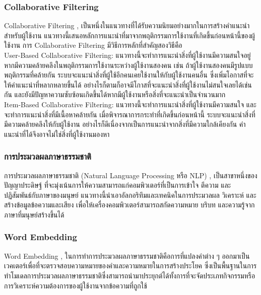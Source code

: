 \documentclass[14pt,oneside,openright,a4paper]{cpe-thai-project}
\begin{document}
\subsubsection {Collaborative Filtering}
  Collaborative Filtering \cite{Item-Based}, \cite{Content-Boosted} เป็นหนึ่งในแนวทางที่ได้รับความนิยมอย่างมากในการสร้างคำแนะนำสำหรับผู้ใช้งาน แนวทางนี้เสนอหลักการแนะนำที่มาจากพฤติกรรมการใช้งานที่เกิดขึ้นก่อนหน้านี้ของผู้ใช้งาน 
  การ Collaborative Filtering มีวิธีการหลักที่สำคัญสองวิธีคือ \\
  User-Based Collaborative Filtering: แนวทางนี้จะทำการแนะนำสิ่งที่ผู้ใช้งานมีความสนใจอยู่ หากมีความคล้ายคลึงในพฤติกรรมการใช้งานระหว่างผู้ใช้งานสองคน 
  เช่น ถ้าผู้ใช้งานสองคนมีรูปแบบพฤติกรรมที่คล้ายกัน ระบบจะแนะนำสิ่งที่ผู้ใช้อีกคนเคยใช้งานให้กับผู้ใช้งานคนอื่น ซึ่งเพิ่มโอกาสที่จะให้คำแนะนำที่หลากหลายขึ้นได้ 
  อย่างไรก็ตามก็อาจมีโกาสที่จะแนะนำสิ่งที่ผู้ใช้งานไม่สนใจเลยได้เช่นกัน และยังมีปัญหาความซับซ้อนเกิดขึ้นได้หากมีผู้ใช้งานหรือสิ่งที่จะแนะนำเป็นจำนวนมาก \\
  Item-Based Collaborative Filtering: แนวทางนี้จะทำการแนะนำสิ่งที่ผู้ใช้งานมีความสนใจ และจะทำการแนะนำสิ่งที่มีเนื้อหาคล้ายกัน เมื่อพิจารณาการกระทำที่เกิดขึ้นก่อนหน้านี้ 
  ระบบจะแนะนำสิ่งที่มีความคล้ายคลึงให้กับผู้ใช้งาน อย่างไรก็ดีเนื่องจากเป็นการแนะนำจากสิ่งที่มีความใกล้เคียงกัน คำแนะนำที่ได้จึงอาจไม่ใช่สิ่งที่ผู้ใช้งานมองหา \\
\subsubsection {การประมวลผลภาษาธรรมชาติ}
การประมวลผลภาษาธรรมชาติ (Natural Language Processing หรือ NLP) \cite{recommendation}, \cite{NLPforContentbase} เป็นสาขาหนึ่งของปัญญาประดิษฐ์ ที่จะมุ่งเน้นการให้ความสามารถแก่คอมพิวเตอร์ที่เป็นการเข้าใจ ตีความ และปฏิสัมพันธ์กับภาษาของมนุษย์ 
แนวทางนี้นำเอาอัลกอริทึมและเทคนิคในการประมวลผล วิเคราะห์ และสร้างข้อมูลข้อความและเสียง เพื่อให้เครื่องคอมพิวเตอร์สามารถสกัดความหมาย บริบท และความรู้จากภาษาที่มนุษย์สร้างขึ้นได้ \\
  \subsubsection {Word Embedding}
	 Word Embedding \cite{WordEmbedding}, \cite{WordEmbeddingForCollaborative} ในการทำการประมวลผลภาษาธรรมชาติคือการที่แปลงคำต่าง ๆ ออกมาเป็นเวคเตอร์เพื่อที่จะตรวจสอบความหมายของคำและความหมายในการสร้างประโยค 
   ซึ่งเป็นพื้นฐานในการทำโมเดลการประมวลผลภาษาธรรมชาติซึ่งสามารถนำมาประยุกต์ได้ทั้งการที่จะจัดประเภทกิจกรรมหรือการวิเคราะห์ความต้องการของผู้ใช้งานจากข้อความที่ถูกใช้ \\
\end{document}

